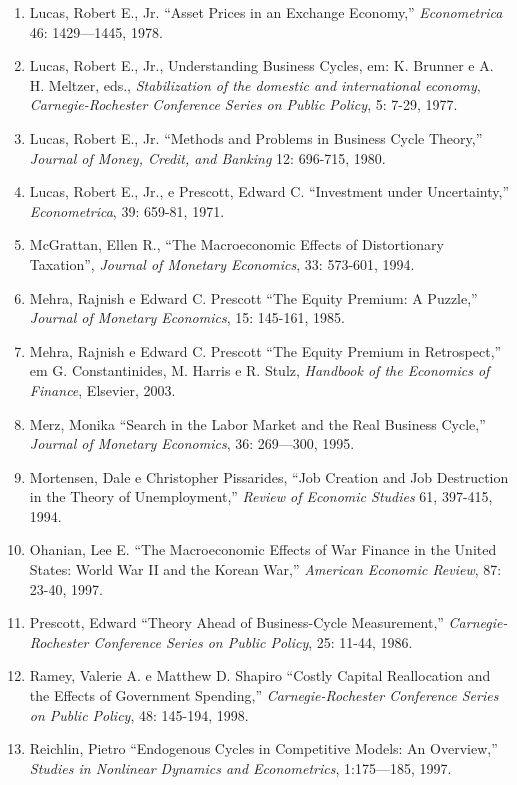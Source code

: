 \documentclass[12pt]{article}
\begin{document}
\begin{enumerate}
    \item Lucas, Robert E., Jr. “Asset Prices in an Exchange Economy,” \textit{Econometrica} 46: 1429—1445, 1978.
    \item Lucas, Robert E., Jr., Understanding Business Cycles, em: K. Brunner e A. H. Meltzer, eds., \textit{Stabilization of the domestic and international economy}, \textit{Carnegie-Rochester Conference Series on Public Policy}, 5: 7-29, 1977.
    \item Lucas, Robert E., Jr. “Methods and Problems in Business Cycle Theory,” \textit{Journal of Money, Credit, and Banking} 12: 696-715, 1980.
    \item Lucas, Robert E., Jr., e Prescott, Edward C. “Investment under Uncertainty,” \textit{Econometrica}, 39: 659-81, 1971.
    \item McGrattan, Ellen R., “The Macroeconomic Effects of Distortionary Taxation”, \textit{Journal of Monetary Economics}, 33: 573-601, 1994.
    \item Mehra, Rajnish e Edward C. Prescott “The Equity Premium: A Puzzle,” \textit{Journal of Monetary Economics}, 15: 145-161, 1985.
    \item Mehra, Rajnish e Edward C. Prescott “The Equity Premium in Retrospect,” em G. Constantinides, M. Harris e R. Stulz, \textit{Handbook of the Economics of Finance}, Elsevier, 2003.
    \item Merz, Monika “Search in the Labor Market and the Real Business Cycle,” \textit{Journal of Monetary Economics}, 36: 269—300, 1995.
    \item Mortensen, Dale e Christopher Pissarides, “Job Creation and Job Destruction in the Theory of Unemployment,” \textit{Review of Economic Studies} 61, 397-415, 1994.
    \item Ohanian, Lee E. “The Macroeconomic Effects of War Finance in the United States: World War II and the Korean War,” \textit{American Economic Review}, 87: 23-40, 1997.
    \item Prescott, Edward “Theory Ahead of Business-Cycle Measurement,” \textit{Carnegie-Rochester Conference Series on Public Policy}, 25: 11-44, 1986.
    \item Ramey, Valerie A. e Matthew D. Shapiro “Costly Capital Reallocation and the Effects of Government Spending,” \textit{Carnegie-Rochester Conference Series on Public Policy}, 48: 145-194, 1998.
    \item Reichlin, Pietro “Endogenous Cycles in Competitive Models: An Overview,” \textit{Studies in Nonlinear Dynamics and Econometrics}, 1:175—185, 1997.

\end{enumerate}
\end{document}
